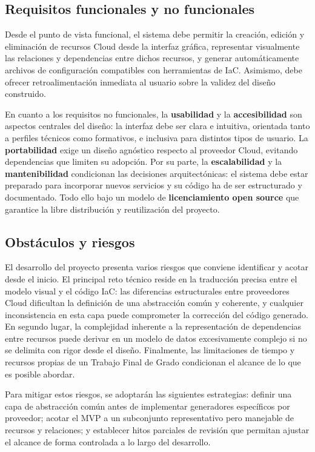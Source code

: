 \documentclass{article}
\begin{document}
{        \subsection{Requisitos funcionales y no funcionales}
        \label{sec:Alcance_requisitos}
        \justify
        Desde el punto de vista funcional, el sistema debe permitir la creación, edición y 
        eliminación de recursos Cloud desde la interfaz gráfica, representar visualmente las 
        relaciones y dependencias entre dichos recursos, y generar automáticamente archivos 
        de configuración compatibles con herramientas de IaC. Asimismo, debe ofrecer 
        retroalimentación inmediata al usuario sobre la validez del diseño construido.

        \justify
        En cuanto a los requisitos no funcionales, la \textbf{usabilidad} y la 
        \textbf{accesibilidad} son aspectos centrales del diseño: la interfaz debe ser clara 
        e intuitiva, orientada tanto a perfiles técnicos como formativos, e inclusiva para 
        distintos tipos de usuario. La \textbf{portabilidad} exige un diseño agnóstico respecto 
        al proveedor Cloud, evitando dependencias que limiten su adopción. Por su parte, la 
        \textbf{escalabilidad} y la \textbf{mantenibilidad} condicionan las decisiones 
        arquitectónicas: el sistema debe estar preparado para incorporar nuevos servicios y 
        su código ha de ser estructurado y documentado. Todo ello bajo un modelo de 
        \textbf{licenciamiento open source} que garantice la libre distribución y 
        reutilización del proyecto.
        \par

        \subsection{Obstáculos y riesgos}
        \label{sec:Alcance_obstaculos}
        \justify
        El desarrollo del proyecto presenta varios riesgos que conviene identificar y acotar 
        desde el inicio. El principal reto técnico reside en la traducción precisa entre el 
        modelo visual y el código IaC: las diferencias estructurales entre proveedores Cloud 
        dificultan la definición de una abstracción común y coherente, y cualquier inconsistencia 
        en esta capa puede comprometer la corrección del código generado. En segundo lugar, la 
        complejidad inherente a la representación de dependencias entre recursos puede derivar 
        en un modelo de datos excesivamente complejo si no se delimita con rigor desde el diseño. 
        Finalmente, las limitaciones de tiempo y recursos propias de un Trabajo Final de Grado 
        condicionan el alcance de lo que es posible abordar.

        \justify
        Para mitigar estos riesgos, se adoptarán las siguientes estrategias: definir una capa de 
        abstracción común antes de implementar generadores específicos por proveedor; acotar el 
        MVP a un subconjunto representativo pero manejable de recursos y relaciones; y establecer 
        hitos parciales de revisión que permitan ajustar el alcance de forma controlada a lo largo 
        del desarrollo.
        \par
    }
\end{document}
